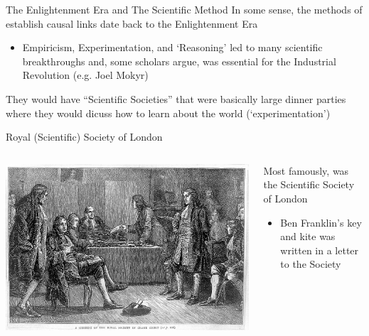 \documentclass[aspectratio=169,t,11pt,table]{beamer}
\begin{document}
\begin{frame}{The Enlightenment Era and The Scientific Method}
  In some sense, the methods of establish causal links date back to the Enlightenment Era
  \begin{itemize}
    \item Empiricism, Experimentation, and `Reasoning' led to many scientific breakthroughs and, some scholars argue, was essential for the Industrial Revolution (e.g. Joel Mokyr)
  \end{itemize}

  \pause
  \bigskip
  They would have ``Scientific Societies'' that were basically large dinner parties where they would dicuss how to learn about the world (`experimentation') 
\end{frame}

\begin{frame}{Royal (Scientific) Society of London}
  \begin{columns}[T]
    \begin{column}{.55\textwidth}\vspace*{-\bigskipamount}
      \begin{center}
        \includegraphics[width = \textwidth]{figures/royal_society.jpg}
      \end{center}
    \end{column}
    \begin{column}{.45\textwidth}
      Most famously, was the Scientific Society of London
      \begin{itemize}
        \item Ben Franklin's key and kite was written in a letter to the Society
      \end{itemize}
    \end{column}
  \end{columns}
\end{frame}
\end{document}
